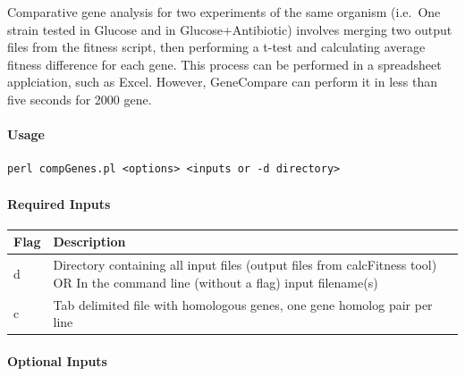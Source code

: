\documentclass[11pt,]{article}
\let\oldparagraph\paragraph
\renewcommand{\paragraph}[1]{\oldparagraph{#1}\mbox{}}
\begin{document}
Comparative gene analysis for two experiments of the same organism
(i.e.~One strain tested in Glucose and in Glucose+Antibiotic) involves
merging two output files from the fitness script, then performing a
t-test and calculating average fitness difference for each gene. This
process can be performed in a spreadsheet applciation, such as Excel.
However, GeneCompare can perform it in less than five seconds for 2000
gene.

\paragraph{Usage}\label{usage-3}

\begin{verbatim}
perl compGenes.pl <options> <inputs or -d directory>
\end{verbatim}

\paragraph{Required Inputs}\label{required-inputs-3}

\begin{longtable}[]{@{}ll@{}}
\toprule
\begin{minipage}[b]{0.05\columnwidth}\raggedright\strut
Flag\strut
\end{minipage} & \begin{minipage}[b]{0.89\columnwidth}\raggedright\strut
Description\strut
\end{minipage}\tabularnewline
\midrule
\endhead
\begin{minipage}[t]{0.05\columnwidth}\raggedright\strut
d\strut
\end{minipage} & \begin{minipage}[t]{0.89\columnwidth}\raggedright\strut
Directory containing all input files (output files from calcFitness
tool) OR In the command line (without a flag) input filename(s)\strut
\end{minipage}\tabularnewline
\begin{minipage}[t]{0.05\columnwidth}\raggedright\strut
c\strut
\end{minipage} & \begin{minipage}[t]{0.89\columnwidth}\raggedright\strut
Tab delimited file with homologous genes, one gene homolog pair per
line\strut
\end{minipage}\tabularnewline
\bottomrule
\end{longtable}

\paragraph{Optional Inputs}\label{optional-inputs-3}
\end{document}
